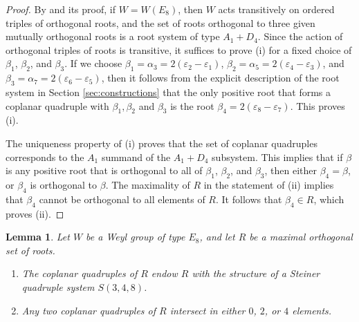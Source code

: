 \documentclass[11pt]{amsart}
\theoremstyle{plain}
\newtheorem{lemma}[theorem]{Lemma}
\theoremstyle{definition}
\theoremstyle{remark}
\numberwithin{equation}{subsection}
\newcommand{\al}{\alpha}
\newcommand{\be}{\beta}
\newcommand{\ep}{\varepsilon}
\newcommand{\coplanar}{coplanar\xspace}
\begin{document}
\begin{proof}
By \cite[Lemma 11 (iii)]{carter72} and its proof, if $W = W(E_8)$, then $W$ acts
transitively on ordered triples of orthogonal roots, and the set of roots
orthogonal to three given mutually orthogonal roots is a root system of type
$A_1 + D_4$. Since the action of orthogonal triples of roots is transitive, it
suffices to prove (i) for a fixed choice of $\be_1$, $\be_2$, and $\be_3$. If we
choose $\be_1 = \al_3 = 2(\ep_2 - \ep_1)$, $\be_2 = \al_5 = 2(\ep_4 - \ep_3)$,
and $\be_3 = \al_7 = 2(\ep_6 - \ep_5)$, then it follows from the explicit
description of the root system in Section \ref{sec:constructions} that the only
positive root that forms a \coplanar quadruple with $\be_1,\be_2$ and $\be_3$ is
the root $\be_4 = 2(\ep_8 - \ep_7)$. This proves (i).

The uniqueness property of (i) proves that the set of \coplanar quadruples
corresponds to the $A_1$ summand of the $A_1 + D_4$ subsystem. This implies that
if $\be$ is any positive root that is orthogonal to all of $\be_1$, $\be_2$, and
$\be_3$, then either $\be_4 = \be$, or $\be_4$ is orthogonal to $\be$. The
maximality of $R$ in the statement of (ii) implies that $\be_4$ cannot be
orthogonal to all elements of $R$. It follows that $\be_4 \in R$, which proves
(ii).
\end{proof}


\begin{lemma}\label{lem:steiner}
Let $W$ be a Weyl group of type $E_8$, and let $R$ be a maximal orthogonal set
of roots.
\begin{enumerate}
    \item[{\rm (i)}]{The \coplanar quadruples of $R$ endow $R$ with the
     structure of a Steiner quadruple system $S(3,4,8)$.}
 \item[{\rm (ii)}]{Any two \coplanar quadruples of $R$ intersect in either $0$,
     $2$, or $4$ elements.}
\end{enumerate}
\end{lemma}
\end{document}
